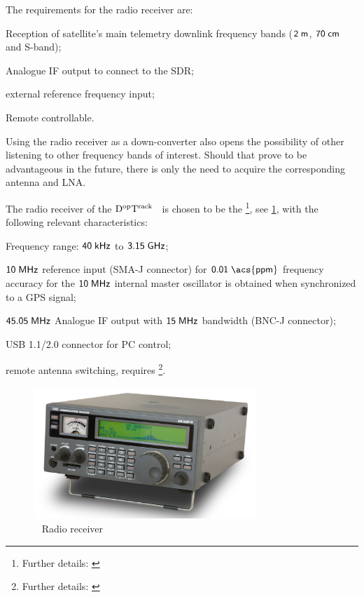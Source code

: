 \documentclass[11pt,a4paper,oneside]{article}
\newcommand{\GroundStationName}{${\rm D^{\rm op}T^{\rm rack}}$}
\newcommand{\semitextwidth}{0.75\textwidth}
\newcommand{\listskip}{0pt}
\newenvironment{itemize*}
{\begin{itemize}
  \setlength{\itemsep}{\listskip}
  \setlength{\parskip}{\listskip}
  \setlength{\parsep}{\listskip}}
{\end{itemize}}
\newcommand{\unit}[2]{$ {\sf #1}\thickspace{\sf #2}$}
\begin{document}
The requirements for the radio receiver are:

\begin{itemize*}
\item Reception of satellite's main telemetry downlink frequency bands (\unit{2}{m}, \unit{70}{cm} and S-band);
\item Analogue \ac{IF} output to connect to the \ac{SDR};
\item external reference frequency input;
\item Remote controllable.
\end{itemize*}

Using the radio receiver as a down-converter also opens the possibility of other listening to other frequency bands of interest. Should that prove to be advantageous in the future, there is only the need to acquire the corresponding antenna and \ac{LNA}.

The radio receiver of the \GroundStationName~ is chosen to be the \modelradio\footnote{Further details: \href{\specsradio}{\specsradioshorturl}}, see \ref{fig:radio}, with the following relevant characteristics:

\begin{itemize*}
\item Frequency range: \unit{40}{kHz} to \unit{3.15}{GHz};
\item \unit{10}{MHz} reference input (SMA-J connector) for \unit{0.01}{\acs{ppm}} frequency accuracy for the \unit{10}{MHz} internal master oscillator is obtained when synchronized to a \ac{GPS} signal;
\item \unit{45.05}{MHz} Analogue \ac{IF} output with \unit{15}{MHz} bandwidth (BNC-J connector);
\item \ac{USB} 1.1/2.0 connector for \ac{PC} control;
\item remote antenna switching, requires \modelradioswitch\footnote{Further details: \href{\urlradioswitch}{\urlshortradioswitch}}.
\end{itemize*}

\begin{figure}[!ht]
\centering
\includegraphics[width=\semitextwidth]{radio}
\caption{\modelradio ~ Radio receiver}
\label{fig:radio}
\end{figure}
\end{document}
